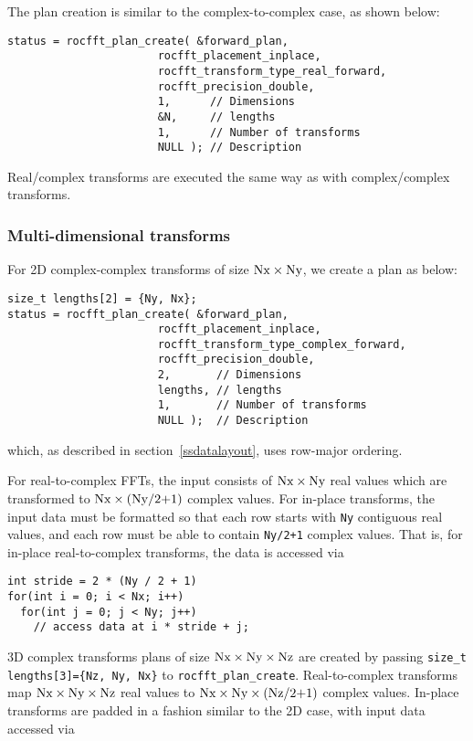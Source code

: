 \documentclass[10pt]{article}
\renewcommand{\(}{\left(}
\renewcommand{\)}{\right)}
\begin{document}
The plan creation is similar to the complex-to-complex case, as shown
below:
\begin{lstlisting}
status = rocfft_plan_create( &forward_plan,
                       rocfft_placement_inplace,
                       rocfft_transform_type_real_forward,
                       rocfft_precision_double,
                       1,      // Dimensions
                       &N,     // lengths
                       1,      // Number of transforms
                       NULL ); // Description
\end{lstlisting}
Real/complex transforms are executed the same way as with
complex/complex transforms.

\subsubsection{Multi-dimensional transforms}

For 2D complex-complex transforms of size
$\text{\lstinline{Nx}}\times\text{\lstinline{Ny}}$, we create a plan
as below:
\begin{lstlisting}
size_t lengths[2] = {Ny, Nx};
status = rocfft_plan_create( &forward_plan,
                       rocfft_placement_inplace,
                       rocfft_transform_type_complex_forward,
                       rocfft_precision_double,
                       2,       // Dimensions
                       lengths, // lengths
                       1,       // Number of transforms
                       NULL );  // Description
\end{lstlisting}
which, as described in section~\ref{ssdatalayout}, uses row-major
ordering.

For real-to-complex FFTs, the input consists of
$\text{\lstinline{Nx}}\times\text{\lstinline{Ny}}$ real values which
are transformed to
$\text{\lstinline{Nx}}\times(\text{\lstinline{Ny/2+1}})$ complex
values.  For in-place transforms, the input data must be formatted so
that each row starts with \lstinline{Ny} contiguous real values, and
each row must be able to contain \lstinline{Ny/2+1} complex values.
That is, for in-place real-to-complex transforms, the data is accessed
via
\begin{lstlisting}
int stride = 2 * (Ny / 2 + 1)
for(int i = 0; i < Nx; i++)
  for(int j = 0; j < Ny; j++)
    // access data at i * stride + j;
\end{lstlisting}

3D complex transforms plans of size
$\text{\lstinline{Nx}}\times\text{\lstinline{Ny}}\times\text{\lstinline{Nz}}$
are created by passing \lstinline|size_t lengths[3]={Nz, Ny, Nx}| to
\lstinline{rocfft_plan_create}.  Real-to-complex transforms map
$\text{\lstinline{Nx}}\times\text{\lstinline{Ny}}\times\text{\lstinline{Nz}}$
real values to
$\text{\lstinline{Nx}}\times\text{\lstinline{Ny}}\times(\text{\lstinline{Nz/2+1}})$
complex values.  In-place transforms are padded in a fashion similar
to the 2D case, with input data accessed via
\end{document}
